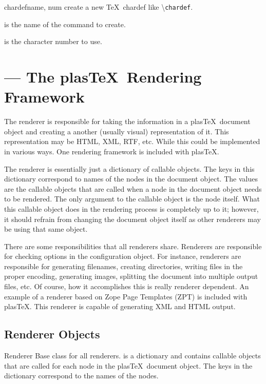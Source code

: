 \documentclass{manual}
\newcommand{\macro}[1]{\textbackslash\texttt{#1}}
\newcommand{\plasTeX}{plas\TeX}
\begin{document}
\begin{methoddesc}[Context]{chardef}{name, num}
create a new \TeX\ chardef like \macro{chardef}.

 is the name of the command to create.

 is the character number to use.
\end{methoddesc}


\section{ --- The \plasTeX\ Rendering Framework}

\modulesynopsis{The \plasTeX\ rendering framework}


The renderer is responsible for taking the information in a \plasTeX\
document object and creating a another (usually visual) representation of it.  
This representation may be HTML, XML, RTF, etc.  While this could be
implemented in various ways.  One rendering framework is included with
\plasTeX.

The renderer is essentially just a dictionary of callable objects.  The
keys in this dictionary correspond to names of the nodes in the document
object.  The values are the callable objects that are called when a
node in the document object needs to be rendered.  The only argument
to the callable object is the node itself.  What this callable object
does in the rendering process is completely up to it; however, it should
refrain from changing the document object itself as other renderers 
may be using that same object.

There are some responsibilities that all renderers share.  Renderers
are responsible for checking options in the configuration object.
For instance, renderers are responsible for generating filenames, 
creating directories, writing files in the proper encoding, generating
images, splitting the document into multiple output files, etc.
Of course, how it accomplishes this is really renderer dependent.
An example of a renderer based on Zope Page Templates (ZPT) is included
with \plasTeX.  This renderer is capable of generating XML and HTML
output.


\subsection{Renderer Objects}

\begin{classdesc}{Renderer}{}
Base class for all renderers.   is a dictionary and
contains callable objects that are called for each node in the \plasTeX\
document object.  The keys in the dictionary correspond to the names of
the nodes.
\end{classdesc}
\end{document}
